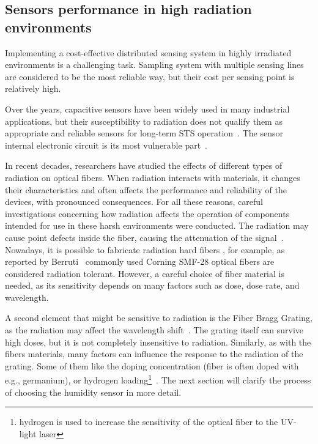 \subsection{Sensors performance in high radiation environments}
\label{fos_irrad}
Implementing a cost-effective distributed sensing system in highly irradiated environments is a challenging task. Sampling system with multiple sensing lines are considered to be the most reliable way, but their cost per sensing point is relatively high. 

Over the years, capacitive sensors have been widely used in many industrial applications, but their susceptibility to radiation does not qualify them as appropriate and reliable sensors for long-term \gls{STS} operation~\cite{Kapic, capacitive_irrad, Berruti}. The sensor internal electronic circuit is its most vulnerable part~\cite{SHCHEMEROV20222871}.

In recent decades, researchers have studied the effects of different types of radiation on optical fibers. When radiation interacts with materials, it changes their characteristics and often affects the performance and reliability of the devices, with pronounced consequences. For all these reasons, careful investigations concerning how radiation affects the operation of components intended for use in these harsh environments were conducted. The radiation may cause point defects inside the fiber, causing the attenuation of the signal~\cite{FOS_FIB_RAD}. Nowadays, it is possible to fabricate radiation hard fibers \cite{troska}, for example, as reported by Berruti~\cite{Berruti} commonly used Corning SMF-28 optical fibers are considered radiation tolerant. However, a careful choice of fiber material is needed, as its sensitivity depends on many factors such as dose, dose rate, and wavelength.  

A second element that might be sensitive to radiation is the  Fiber Bragg Grating, as the radiation may affect the wavelength shift~\cite{gusarov}. The grating itself can survive high doses, but it is not completely insensitive to radiation. Similarly, as with the fibers materials, many factors can influence the response to the radiation of the grating. Some of them like the doping concentration (fiber is often doped with e.g., germanium), or hydrogen loading\footnote{hydrogen is used to increase the sensitivity of the optical fiber to the UV-light laser}~\cite{gusarov}. The next section will clarify the process of choosing the humidity sensor in more detail. 


